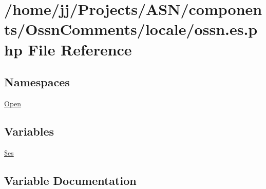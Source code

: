 \hypertarget{components_2_ossn_comments_2locale_2ossn_8es_8php}{}\section{/home/jj/\+Projects/\+A\+S\+N/components/\+Ossn\+Comments/locale/ossn.es.\+php File Reference}
\label{components_2_ossn_comments_2locale_2ossn_8es_8php}
\subsection*{Namespaces}
\begin{DoxyCompactItemize}
\item 
 \hyperlink{namespace_open}{Open}
\end{DoxyCompactItemize}
\subsection*{Variables}
\begin{DoxyCompactItemize}
\item 
\hyperlink{components_2_ossn_comments_2locale_2ossn_8es_8php_a388cbda27103d2baee3997798d1f2744}{\$es}
\end{DoxyCompactItemize}


\subsection{Variable Documentation}
